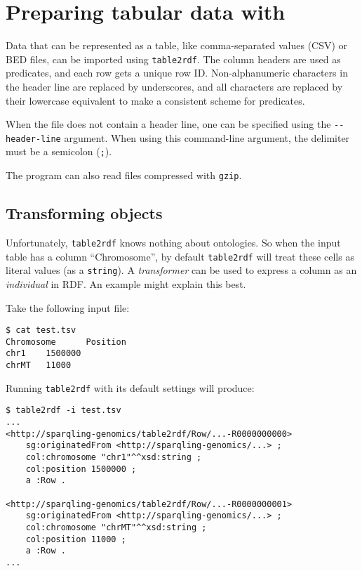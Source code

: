 \section{Preparing tabular data with }
\label{sec:table2rdf}

  Data that can be represented as a table, like comma-separated values (CSV)
  or BED files, can be imported using \texttt{table2rdf}.  The column headers
  are used as predicates, and each row gets a unique row ID.  Non-alphanumeric
  characters in the header line are replaced by underscores, and all characters
  are replaced by their lowercase equivalent to make a consistent scheme for
  predicates.

  When the file does not contain a header line, one can be specified using the
  \texttt{-{}-header-line} argument.  When using this command-line argument, the
  delimiter must be a semicolon (\texttt{;}).

  The program can also read files compressed with \texttt{gzip}.

\subsection{Transforming objects}

  Unfortunately, \texttt{table2rdf} knows nothing about ontologies.  So when
  the input table has a column ``Chromosome'', by default \texttt{table2rdf}
  will treat these cells as literal values (as a \texttt{string}).  A
  \emph{transformer} can be used to express a column as an \emph{individual} in
  RDF.  An example might explain this best.

  Take the following input file:
\begin{siderules}
\begin{verbatim}
$ cat test.tsv
Chromosome      Position
chr1    1500000
chrMT   11000
\end{verbatim}
\end{siderules}

  Running \texttt{table2rdf} with its default settings will produce:

\begin{siderules}
\begin{verbatim}
$ table2rdf -i test.tsv
...
<http://sparqling-genomics/table2rdf/Row/...-R0000000000>
    sg:originatedFrom <http://sparqling-genomics/...> ;
    col:chromosome "chr1"^^xsd:string ;
    col:position 1500000 ;
    a :Row .

<http://sparqling-genomics/table2rdf/Row/...-R0000000001>
    sg:originatedFrom <http://sparqling-genomics/...> ;
    col:chromosome "chrMT"^^xsd:string ;
    col:position 11000 ;
    a :Row .
...
\end{verbatim}
\end{siderules}

